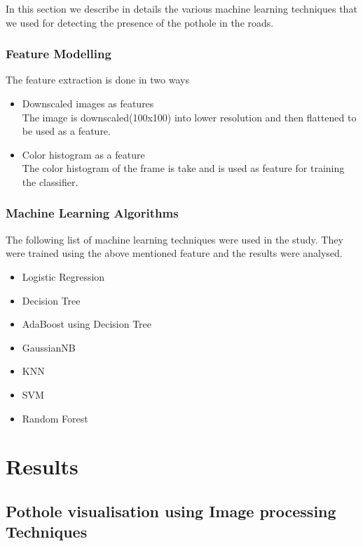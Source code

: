 \documentclass[journal]{IEEEtran}
\begin{document}
In this section we describe in details the various machine learning techniques that we used for detecting the presence of the pothole in the roads.

\subsubsection{Feature Modelling}

The feature extraction is done in two ways 
\begin{itemize}
\item Downscaled images as features \\
The image is downscaled(100x100) into lower resolution and then flattened to be used as a feature.
\item Color histogram as a feature \\
The color histogram of the frame is take and is used as feature for training the classifier.
\end{itemize}


\subsubsection{Machine Learning Algorithms}

The following list of machine learning techniques were used in the study. They were trained using the above mentioned feature and the results were analysed.

\begin{itemize}
\item Logistic Regression \cite{lr}
\item Decision Tree \cite{dt}
\item AdaBoost using Decision Tree
\item GaussianNB
\item KNN \cite{knn}
\item SVM \cite{svm}
\item Random Forest \cite{rf}
\end{itemize}

\section{Results}


\subsection{Pothole visualisation using Image processing Techniques}
\end{document}
